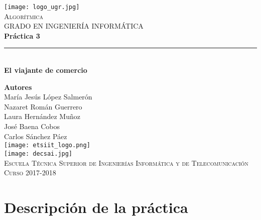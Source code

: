 \documentclass[12pt,spanish]{article}
\begin{document}
\begin{titlepage}

\newlength{\centeroffset}
\setlength{\centeroffset}{-0.5\oddsidemargin}
\addtolength{\centeroffset}{0.5\evensidemargin}
\thispagestyle{empty}

\noindent\hspace*{\centeroffset}
\begin{minipage}{\textwidth}

\centering
\texttt{[image: logo\_ugr.jpg]}\\[1.4cm]

\textsc{ \Large Algorítmica\\[0.2cm]}
\textsc{GRADO EN INGENIERÍA INFORMÁTICA}\\[1cm]

{\Huge\bfseries Práctica 3\\}
\noindent\rule[-1ex]{\textwidth}{3pt}\\[3.5ex]
{\large\bfseries El viajante de comercio}
\end{minipage}

\vspace{1.5cm}
\noindent\hspace*{\centeroffset}
\begin{minipage}{\textwidth}
\centering

\textbf{Autores}\\ {María Jesús López Salmerón \\ Nazaret Román Guerrero \\ Laura Hernández Muñoz \\ José Baena Cobos  \\ Carlos Sánchez Páez}\\[2.5ex]
\texttt{[image: etsiit\_logo.png]}\\[0.1cm]
\vspace{1.5cm}
\texttt{[image: decsai.jpg]}\\[0.1cm]
\vspace{1cm}
\textsc{Escuela Técnica Superior de Ingenierías Informática y de Telecomunicación}\\
\vspace{1cm}
\textsc{Curso 2017-2018}
\end{minipage}
\end{titlepage}
\tableofcontents
\thispagestyle{empty}
\listoffigures
\newpage
\setcounter{page}{1}
\section{Descripción de la práctica}
\end{document}

